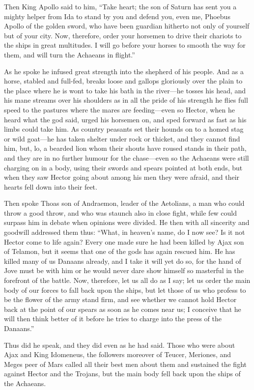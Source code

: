 Then King Apollo said to him, “Take heart; the son of Saturn has sent you
a mighty helper from Ida to stand by you and defend you, even me, Phoebus
Apollo of the golden sword, who have been guardian hitherto not only of
yourself but of your city. Now, therefore, order your horsemen to drive
their chariots to the ships in great multitudes. I will go before your
horses to smooth the way for them, and will turn the Achaeans in flight.”

As he spoke he infused great strength into the shepherd of his people. And
as a horse, stabled and full-fed, breaks loose and gallops gloriously over
the plain to the place where he is wont to take his bath in the river—he
tosses his head, and his mane streams over his shoulders as in all the
pride of his strength he flies full speed to the pastures where the mares
are feeding—even so Hector, when he heard what the god said, urged
his horsemen on, and sped forward as fast as his limbs could take him. As
country peasants set their hounds on to a homed stag or wild goat—he
has taken shelter under rock or thicket, and they cannot find him, but,
lo, a bearded lion whom their shouts have roused stands in their path, and
they are in no further humour for the chase—even so the Achaeans
were still charging on in a body, using their swords and spears pointed at
both ends, but when they saw Hector going about among his men they were
afraid, and their hearts fell down into their feet.

Then spoke Thoas son of Andraemon, leader of the Aetolians, a man who
could throw a good throw, and who was staunch also in close fight, while
few could surpass him in debate when opinions were divided. He then with
all sincerity and goodwill addressed them thus: “What, in heaven’s name,
do I now see? Is it not Hector come to life again? Every one made sure he
had been killed by Ajax son of Telamon, but it seems that one of the gods
has again rescued him. He has killed many of us Danaans already, and I
take it will yet do so, for the hand of Jove must be with him or he would
never dare show himself so masterful in the forefront of the battle. Now,
therefore, let us all do as I say; let us order the main body of our
forces to fall back upon the ships, but let those of us who profess to be
the flower of the army stand firm, and see whether we cannot hold Hector
back at the point of our spears as soon as he comes near us; I conceive
that he will then think better of it before he tries to charge into the
press of the Danaans.”

Thus did he speak, and they did even as he had said. Those who were about
Ajax and King Idomeneus, the followers moreover of Teucer, Meriones, and
Meges peer of Mars called all their best men about them and sustained the
fight against Hector and the Trojans, but the main body fell back upon the
ships of the Achaeans.

